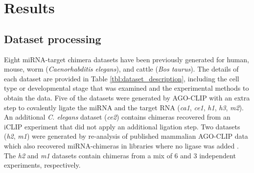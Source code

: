 \documentclass{bmcart}
\begin{document}

\clearpage
\section*{Results}
\subsection*{Dataset processing}
Eight miRNA-target chimera datasets have been previously generated for human, mouse, worm (\textit{Caenorhabditis elegans}), and cattle (\textit{Bos taurus}).
The details of each dataset are provided in Table \ref{tbl:dataset_description}, including the cell type or developmental stage that was examined and the experimental methods to obtain the data. Five of the datasets were generated by AGO-CLIP with an extra step to covalently ligate the miRNA and the target RNA (\textit{ca1}, \textit{ce1}, \textit{h1},  \textit{h3}, \textit{m2}). An additional \textit{C. elegans} dataset (\textit{ce2}) contains chimeras recovered from an iCLIP experiment that did not apply an additional ligation step. Two datasets (\textit{h2}, \textit{m1}) were generated by re-analysis of published mammalian AGO-CLIP data which also recovered miRNA-chimeras in libraries where no ligase was added \cite{grosswendt2014unambiguous}. The \textit{h2} and \textit{m1} datasets contain chimeras from a mix of 6 and 3 independent experiments, respectively.
\end{document}
